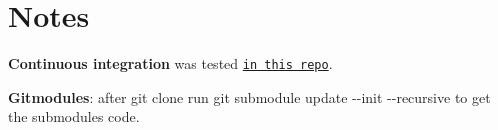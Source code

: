 \section*{Notes}


\begin{DoxyItemize}
\item {\bfseries Continuous integration} was tested \href{https://github.com/MRKonrad/ContinousIntegrationPlayground}{\tt in this repo}.
\item {\bfseries Gitmodules}\-: after {\ttfamily git clone} run {\ttfamily git submodule update -\/-\/init -\/-\/recursive} to get the submodules code. 
\end{DoxyItemize}